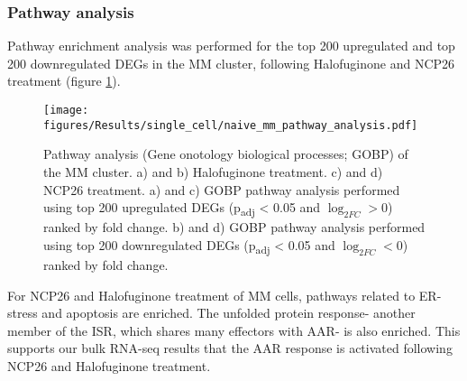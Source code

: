\subsubsection{Pathway analysis}
Pathway enrichment analysis was performed for the top 200 upregulated and top 200 downregulated DEGs in the MM cluster, following Halofuginone and NCP26 treatment (figure \ref{fig:naive_mm_pathway_analysis}).
\begin{figure}[htb]
\centering
\texttt{[image: figures/Results/single\_cell/naive\_mm\_pathway\_analysis.pdf]}
\caption[scRNA-seq MM cluster pathway analysis]{Pathway analysis (Gene onotology biological processes; GOBP) of the MM cluster.
    a) and b) Halofuginone treatment.
    c) and d) NCP26 treatment.
a) and c) GOBP pathway analysis performed using top 200 upregulated DEGs (p\textsubscript{adj} < 0.05 and $\log_{2FC}>0$) ranked by fold change.
b) and d) GOBP pathway analysis performed using top 200 downregulated DEGs (p\textsubscript{adj} < 0.05 and $\log_{2FC}<0$) ranked by fold change.}
\label{fig:naive_mm_pathway_analysis}
\end{figure}

For NCP26 and Halofuginone treatment of MM cells, pathways related to ER-stress and apoptosis are enriched.
The unfolded protein response- another member of the ISR, which shares many effectors with AAR- is also enriched.
This supports our bulk RNA-seq results that the AAR response is activated following NCP26 and Halofuginone treatment.

